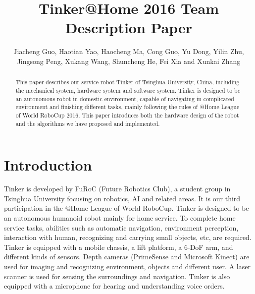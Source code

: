 \documentclass[runningheads,a4paper]{llncs}
\begin{document}
	
\title{Tinker@Home 2016 Team Description Paper}
\author{Jiacheng Guo, Haotian Yao, Haocheng Ma, Cong Guo, Yu Dong, Yilin Zhu, Jingsong Peng, Xukang Wang, Shuncheng He, Fei Xia and Xunkai Zhang}
\maketitle


\begin{abstract}
This paper describes our service robot Tinker of Tsinghua University, China, including the mechanical system, hardware system and software system. Tinker is designed to be an autonomous robot in domestic environment, capable of navigating in complicated environment and finishing different tasks, mainly following the rules of @Home League of World RoboCup 2016. This paper introduces both the hardware design of the robot and the algorithms we have proposed and implemented.
\end{abstract}


\section{Introduction}
Tinker is developed by FuRoC (Future Robotics Club), a student group in Tsinghua University focusing on robotics, AI and related areas. It is our third participation in the @Home League of World RoboCup. Tinker is designed to be an autonomous humanoid robot mainly for home service. To complete home service tasks, abilities such as automatic navigation, environment perception, interaction with human, recognizing and carrying small objects, etc, are required. Tinker is equipped with a mobile chassis, a lift platform, a 6-DoF arm, and different kinds of sensors. Depth cameras (PrimeSense and Microsoft Kinect) are used for imaging and recognizing environment, objects and different user. A laser scanner is used for sensing the surroundings and navigation. Tinker is also equipped with a microphone for hearing and understanding voice orders.
\end{document}
